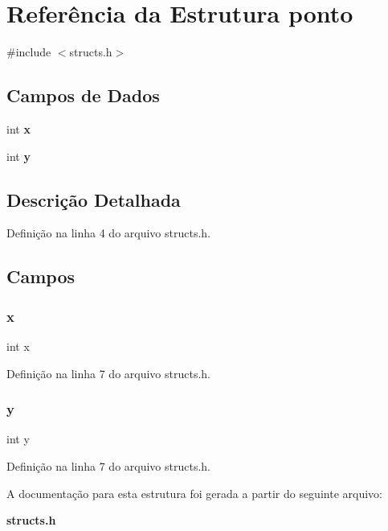 \section{Referência da Estrutura ponto}
\label{structponto}


{\ttfamily \#include $<$structs.\+h$>$}

\subsection*{Campos de Dados}
\begin{DoxyCompactItemize}
\item 
int \textbf{ x}
\item 
int \textbf{ y}
\end{DoxyCompactItemize}


\subsection{Descrição Detalhada}


Definição na linha 4 do arquivo structs.\+h.



\subsection{Campos}
\mbox{\label{structponto_a6150e0515f7202e2fb518f7206ed97dc}} 
\subsubsection{x}
{\footnotesize\ttfamily int x}



Definição na linha 7 do arquivo structs.\+h.

\mbox{\label{structponto_a0a2f84ed7838f07779ae24c5a9086d33}} 
\subsubsection{y}
{\footnotesize\ttfamily int y}



Definição na linha 7 do arquivo structs.\+h.



A documentação para esta estrutura foi gerada a partir do seguinte arquivo\+:\begin{DoxyCompactItemize}
\item 
\textbf{ structs.\+h}\end{DoxyCompactItemize}
